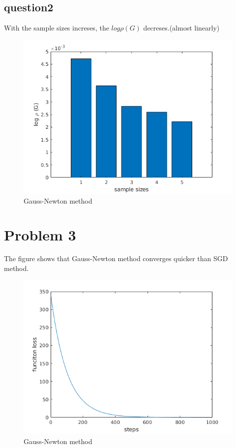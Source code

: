 \documentclass[a4paper, 11pt]{article}
\begin{document}
\subsection*{question2}
With the sample sizes increses, the $log\rho(G)$ decreses.(almost linearly)
\begin{figure}[htbp]
\centering
\includegraphics[scale=1]{figure/p2_2.png}
\caption{Gauss-Newton method}
\label{p2_2}
\end{figure}

\newpage
\section*{Problem 3}
The figure shows that Gauss-Newton method converges quicker than SGD method.
\begin{figure}[htbp]
\centering
\includegraphics[scale=1]{figure/p3.png}
\caption{Gauss-Newton method}
\label{p3}
\end{figure}
\end{document}
